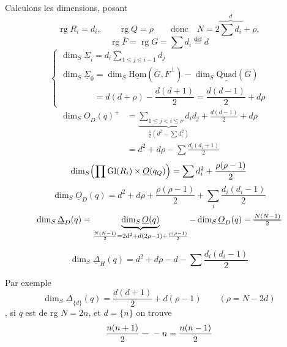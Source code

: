 \documentclass[11pt,a4paper]{article}
\begin{document}
Calculons les dimensions, posant
\[
\operatorname{rg} R_i = d_i,\qquad \operatorname{rg} Q = \rho \qquad\text{donc}\quad N = 2\overbrace{\textstyle\sum d_i}^{d}+\rho,
\]
\[
\operatorname{rg}\overline{F} = \operatorname{rg} G = \sum d_i \overset{\text{déf}}{=} d
\]
\[
\begin{cases}
\dim_S \underline{\Sigma}_i = d_i \displaystyle\sum_{1\le j\le i-1} d_j\\[1ex]
\dim_S \underline{\Sigma}_0 = \dim_S \underline{\mathrm{Hom}}(\overline{G},\overline{F}^{\perp}) - \dim_S \underline{\mathrm{Quad}}(\overline{G})\\[1ex]
\phantom{\dim_S \underline{\Sigma}_0} = d(d+\rho) - \dfrac{d(d+1)}{2} = \dfrac{d(d-1)}{2}+d\rho
\end{cases}
\]
\[
\begin{aligned}
\dim_S \underline{O}_D(q)^{+} &= \underbrace{\sum_{1\le j<i\le\nu} d_i d_j}_{\frac12(d^2-\sum d_i^2)} + \frac{d(d-1)}{2} + d\rho\\
&= d^2 + d\rho - \sum\frac{d_i(d_i+1)}{2}
\end{aligned}
\]
\[
\dim_S\Bigl(\prod \mathrm{Gl}(R_i)\times\underline{O}(q_Q)\Bigr) = \sum d_i^2 + \frac{\rho(\rho-1)}{2}
\]
\[
\dim_S \underline{O}_D(q) = d^2 + d\rho + \frac{\rho(\rho-1)}{2} + \sum_i \frac{d_i(d_i-1)}{2}
\]
\[
\dim_S \underline{\Delta}_D(q) = \underbrace{\dim_S \underline{O}(q)}_{\frac{N(N-1)}{2} = 2d^2+d(2\rho-1)+\frac{\rho(\rho-1)}{2}} - \dim_S \underline{O}_D(q) = \text{\struck{$\frac{N(N-1)}{2}$}}
\]

\[
\dim_S \underline{\Delta}_H(q) = d^2 + d\rho - d - \sum\frac{d_i(d_i-1)}{2}
\]

Par exemple
\[
\dim_S \underline{\Delta}_{\{d\}}(q) = \frac{d(d+1)}{2} + d(\rho-1) \qquad (\rho = N-2d)
\]
, si $q$ est de rg $N=2n$, et $d=\{n\}$ 
on trouve
\[
\frac{n(n+1)}{2}\ \text{\struck{$-$}}\ - n = \frac{n(n-1)}{2}
\]


\end{document}
